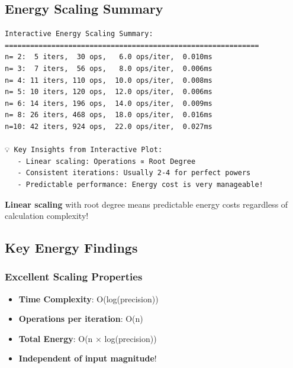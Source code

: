 \documentclass[
  letterpaper,
  DIV=11,
  numbers=noendperiod]{scrartcl}
\providecommand{\tightlist}{%
  \setlength{\itemsep}{0pt}\setlength{\parskip}{0pt}}
\begin{document}
\subsection{Energy Scaling Summary}\label{energy-scaling-summary}

\begin{verbatim}
Interactive Energy Scaling Summary:
============================================================
n= 2:  5 iters,  30 ops,   6.0 ops/iter,  0.010ms
n= 3:  7 iters,  56 ops,   8.0 ops/iter,  0.006ms
n= 4: 11 iters, 110 ops,  10.0 ops/iter,  0.008ms
n= 5: 10 iters, 120 ops,  12.0 ops/iter,  0.006ms
n= 6: 14 iters, 196 ops,  14.0 ops/iter,  0.009ms
n= 8: 26 iters, 468 ops,  18.0 ops/iter,  0.016ms
n=10: 42 iters, 924 ops,  22.0 ops/iter,  0.027ms

💡 Key Insights from Interactive Plot:
   - Linear scaling: Operations ∝ Root Degree
   - Consistent iterations: Usually 2-4 for perfect powers
   - Predictable performance: Energy cost is very manageable!
\end{verbatim}

\begin{tcolorbox}[enhanced jigsaw, title=\textcolor{quarto-callout-tip-color}{\faLightbulb}\hspace{0.5em}{Energy Efficiency Breakthrough!}, coltitle=black, titlerule=0mm, breakable, arc=.35mm, leftrule=.75mm, rightrule=.15mm, toptitle=1mm, colback=white, colframe=quarto-callout-tip-color-frame, colbacktitle=quarto-callout-tip-color!10!white, bottomtitle=1mm, opacityback=0, toprule=.15mm, left=2mm, opacitybacktitle=0.6, bottomrule=.15mm]

{\textbf{Linear scaling}} with root degree means predictable energy
costs regardless of calculation complexity!

\end{tcolorbox}

\subsection{Key Energy Findings}\label{key-energy-findings}

\subsubsection{\texorpdfstring{\textbf{Excellent Scaling
Properties}}{Excellent Scaling Properties}}\label{excellent-scaling-properties}

\begin{itemize}
\tightlist
\item
  \textbf{Time Complexity}: O(log(precision))
\item
  \textbf{Operations per iteration}: O(n)
\item
  \textbf{Total Energy}: O(n × log(precision))
\item
  \textbf{Independent of input magnitude}!
\end{itemize}
\end{document}
